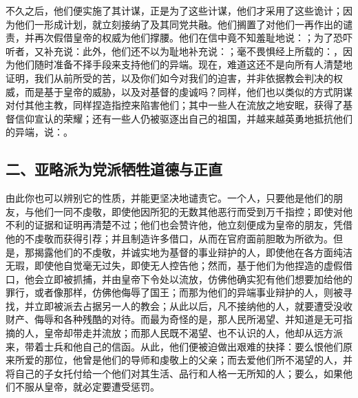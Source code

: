 不久之后，他们便实施了其计谋，正是为了这些计谋，他们才采用了这些诡计；因为他们一形成计划，就立刻接纳了及其同党共融。他们搁置了对他们一再作出的谴责，并再次假借皇帝的权威为他们撑腰。他们在信中竟不知羞耻地说：；为了恐吓听者，又补充说：此外，他们还不以为耻地补充说：；毫不畏惧经上所载的：，因为他们随时准备不择手段来支持他们的异端。现在，难道这还不是向所有人清楚地证明，我们从前所受的苦，以及你们如今对我们的迫害，并非依据教会判决的权威，而是基于皇帝的威胁，以及对基督的虔诚吗？同样，他们也以类似的方式阴谋对付其他主教，同样捏造指控来陷害他们；其中一些人在流放之地安眠，获得了基督信仰宣认的荣耀；还有一些人仍被驱逐出自己的祖国，并越来越英勇地抵抗他们的异端，说：。\par


\subsection{二、亚略派为党派牺牲道德与正直}

由此你也可以辨别它的性质，并能更坚决地谴责它。一个人，只要他是他们的朋友，与他们一同不虔敬，即使他因所犯的无数其他恶行而受到万千指控；即使对他不利的证据和证明再清楚不过；他们也会赞许他，他立刻便成为皇帝的朋友，凭借他的不虔敬而获得引荐；并且制造许多借口，从而在官府面前胆敢为所欲为。但是，那揭露他们的不虔敬，并诚实地为基督的事业辩护的人，即使他在各方面纯洁无瑕，即使他自觉毫无过失，即使无人控告他；然而，基于他们为他捏造的虚假借口，他会立即被抓捕，并由皇帝下令处以流放，仿佛他确实犯有他们想要加给他的罪行，或者像那样，仿佛他侮辱了国王；而那为他们的异端事业辩护的人，则被寻找，并立即被派去占据另一人的教会；从此以后，凡不接纳他的人，就要遭受没收财产、侮辱和各种残酷的对待。而最为奇怪的是，那人民所渴望、并知道是无可指摘的人，皇帝却带走并流放；而那人民既不渴望、也不认识的人，他却从远方派来，带着士兵和他自己的信函。从此，他们便被迫做出艰难的抉择：要么恨他们原来所爱的那位，他曾是他们的导师和虔敬上的父亲；而去爱他们所不渴望的人，并将自己的子女托付给一个他们对其生活、品行和人格一无所知的人；要么，如果他们不服从皇帝，就必定要遭受惩罚。\par


